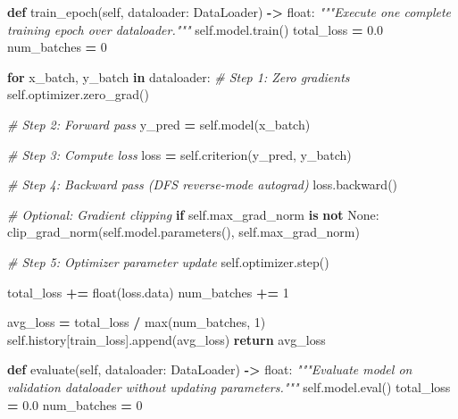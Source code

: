 \documentclass[
  letterpaper,
]{scrbook}
\newenvironment{Shaded}{\begin{snugshade}}{\end{snugshade}}
\newcommand{\BuiltInTok}[1]{#1}
\newcommand{\CommentTok}[1]{\textcolor[rgb]{0.56,0.35,0.01}{\textit{#1}}}
\newcommand{\ControlFlowTok}[1]{\textcolor[rgb]{0.13,0.29,0.53}{\textbf{#1}}}
\newcommand{\DecValTok}[1]{\textcolor[rgb]{0.00,0.00,0.81}{#1}}
\newcommand{\FloatTok}[1]{\textcolor[rgb]{0.00,0.00,0.81}{#1}}
\newcommand{\KeywordTok}[1]{\textcolor[rgb]{0.13,0.29,0.53}{\textbf{#1}}}
\newcommand{\NormalTok}[1]{#1}
\newcommand{\OperatorTok}[1]{\textcolor[rgb]{0.81,0.36,0.00}{\textbf{#1}}}
\newcommand{\StringTok}[1]{\textcolor[rgb]{0.31,0.60,0.02}{#1}}
\newcommand{\VariableTok}[1]{\textcolor[rgb]{0.00,0.00,0.00}{#1}}
\begin{document}
\begin{Shaded}
\begin{Highlighting}[]
    \KeywordTok{def}\NormalTok{ train\_epoch(}\VariableTok{self}\NormalTok{, dataloader: DataLoader) }\OperatorTok{{-}\textgreater{}} \BuiltInTok{float}\NormalTok{:}
        \CommentTok{"""Execute one complete training epoch over dataloader."""}
        \VariableTok{self}\NormalTok{.model.train()}
\NormalTok{        total\_loss }\OperatorTok{=} \FloatTok{0.0}
\NormalTok{        num\_batches }\OperatorTok{=} \DecValTok{0}

        \ControlFlowTok{for}\NormalTok{ x\_batch, y\_batch }\KeywordTok{in}\NormalTok{ dataloader:}
            \CommentTok{\# Step 1: Zero gradients}
            \VariableTok{self}\NormalTok{.optimizer.zero\_grad()}

            \CommentTok{\# Step 2: Forward pass}
\NormalTok{            y\_pred }\OperatorTok{=} \VariableTok{self}\NormalTok{.model(x\_batch)}

            \CommentTok{\# Step 3: Compute loss}
\NormalTok{            loss }\OperatorTok{=} \VariableTok{self}\NormalTok{.criterion(y\_pred, y\_batch)}

            \CommentTok{\# Step 4: Backward pass (DFS reverse{-}mode autograd)}
\NormalTok{            loss.backward()}

            \CommentTok{\# Optional: Gradient clipping}
            \ControlFlowTok{if} \VariableTok{self}\NormalTok{.max\_grad\_norm }\KeywordTok{is} \KeywordTok{not} \VariableTok{None}\NormalTok{:}
\NormalTok{                clip\_grad\_norm(}\VariableTok{self}\NormalTok{.model.parameters(), }\VariableTok{self}\NormalTok{.max\_grad\_norm)}

            \CommentTok{\# Step 5: Optimizer parameter update}
            \VariableTok{self}\NormalTok{.optimizer.step()}

\NormalTok{            total\_loss }\OperatorTok{+=} \BuiltInTok{float}\NormalTok{(loss.data)}
\NormalTok{            num\_batches }\OperatorTok{+=} \DecValTok{1}

\NormalTok{        avg\_loss }\OperatorTok{=}\NormalTok{ total\_loss }\OperatorTok{/} \BuiltInTok{max}\NormalTok{(num\_batches, }\DecValTok{1}\NormalTok{)}
        \VariableTok{self}\NormalTok{.history[}\StringTok{\textquotesingle{}train\_loss\textquotesingle{}}\NormalTok{].append(avg\_loss)}
        \ControlFlowTok{return}\NormalTok{ avg\_loss}

    \KeywordTok{def}\NormalTok{ evaluate(}\VariableTok{self}\NormalTok{, dataloader: DataLoader) }\OperatorTok{{-}\textgreater{}} \BuiltInTok{float}\NormalTok{:}
        \CommentTok{"""Evaluate model on validation dataloader without updating parameters."""}
        \VariableTok{self}\NormalTok{.model.}\BuiltInTok{eval}\NormalTok{()}
\NormalTok{        total\_loss }\OperatorTok{=} \FloatTok{0.0}
\NormalTok{        num\_batches }\OperatorTok{=} \DecValTok{0}


\end{Highlighting}
\end{Shaded}
\end{document}

